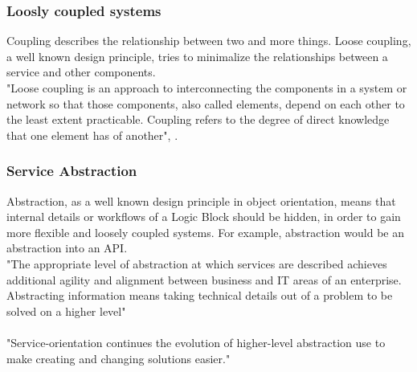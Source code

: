 \documentclass[12pt]{article}
\begin{document}
\subsubsection{Loosly coupled systems}
Coupling describes the relationship between two and more things. Loose coupling, a well known design principle,  tries to minimalize the relationships between a service and other components. \cite[page 87]{te} \\
"Loose coupling is an approach to interconnecting the components in a system or network so that those components, also called elements, depend on each other to the least extent practicable. Coupling refers to the degree of direct knowledge that one element has of another", \cite{loosecoupldef}.
\subsubsection{Service Abstraction}
Abstraction, as a well known design principle in object orientation, means that internal details or workflows of a Logic Block should be hidden, in order to gain more flexible and loosely coupled systems. \cite[page 87]{te} For example, abstraction would be an abstraction into an API.\\
"The appropriate level of abstraction at which services are described achieves additional agility and alignment between business and IT areas of an enterprise. Abstracting information means taking technical details out of a problem to be solved on a higher level"\cite[page 184]{grau}\\\\
"Service-orientation continues the evolution of higher-level abstraction use to make creating and changing solutions easier."\cite[page 184]{grau}
\end{document}

